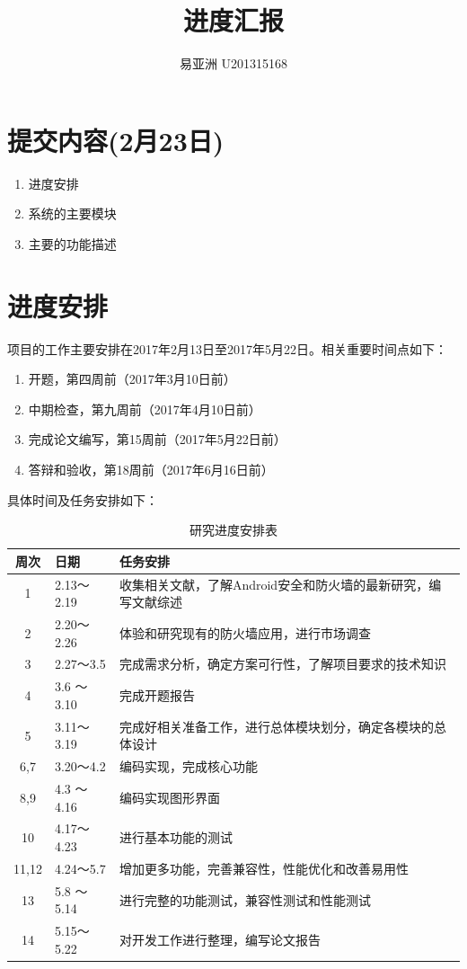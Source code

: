 \documentclass{article}
\begin{document}
\title{进度汇报}
\author{易亚洲 U201315168}

\maketitle

\section{提交内容(2月23日)}

\begin{enumerate}
	\item 进度安排
	\item 系统的主要模块
	\item 主要的功能描述
\end{enumerate}


\section{进度安排}

项目的工作主要安排在2017年2月13日至2017年5月22日。相关重要时间点如下：
\begin{enumerate}
	\item 开题，第四周前（2017年3月10日前）
	\item 中期检查，第九周前（2017年4月10日前）
	\item 完成论文编写，第15周前（2017年5月22日前）
	\item 答辩和验收，第18周前（2017年6月16日前）
\end{enumerate}

具体时间及任务安排如下：

\begin{longtable}[h!]{|c|l|l|}
\caption{研究进度安排表}
\\\hline
周次 	& 日期 & 任务安排\\\hline
1		& 2.13～2.19 & 收集相关文献，了解Android安全和防火墙的最新研究，编写文献综述\\\hline
2		& 2.20～2.26 & 体验和研究现有的防火墙应用，进行市场调查\\\hline
3		& 2.27～3.5  & 完成需求分析，确定方案可行性，了解项目要求的技术知识\\\hline
4		& 3.6 ～3.10 & 完成开题报告\\\hline
5		& 3.11～3.19 & 完成好相关准备工作，进行总体模块划分，确定各模块的总体设计\\\hline
6,7		& 3.20～4.2  & 编码实现，完成核心功能\\\hline
8,9 	& 4.3 ～4.16 & 编码实现图形界面\\\hline
10		& 4.17～4.23 & 进行基本功能的测试\\\hline
11,12	& 4.24～5.7  & 增加更多功能，完善兼容性，性能优化和改善易用性\\\hline
13 		& 5.8 ～5.14 & 进行完整的功能测试，兼容性测试和性能测试\\\hline
14 		& 5.15～5.22 & 对开发工作进行整理，编写论文报告\\\hline
\end{longtable}
\end{document}
